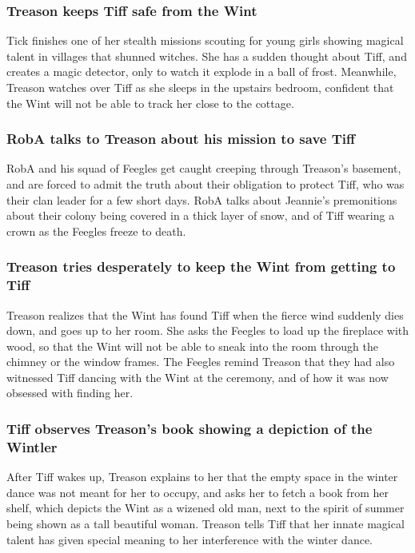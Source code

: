 \subsubsection{\Gls{Treason} keeps \Gls{Tiff} safe from the \Gls{Wint}}
\Gls{Tick} finishes one of her stealth missions scouting for young girls showing magical talent in
villages that shunned witches. She has a sudden thought about \Gls{Tiff}, and creates a magic
detector, only to watch it explode in a ball of frost. Meanwhile, \Gls{Treason} watches over
\Gls{Tiff} as she sleeps in the upstairs bedroom, confident that the \Gls{Wint} will not be able to
track her close to the cottage.

\subsubsection{\Gls{RobA} talks to \Gls{Treason} about his mission to save \Gls{Tiff}}
\Gls{RobA} and his squad of Feegles get caught creeping through \Gls{Treason}'s basement, and are
forced to admit the truth about their obligation to protect \Gls{Tiff}, who was their clan leader
for a few short days. \Gls{RobA} talks about \Gls{Jeannie}'s premonitions about their colony being
covered in a thick layer of snow, and of \Gls{Tiff} wearing a crown as the Feegles freeze to death.

\subsubsection{\Gls{Treason} tries desperately to keep the \Gls{Wint} from getting to \Gls{Tiff}}
\Gls{Treason} realizes that the \Gls{Wint} has found \Gls{Tiff} when the fierce wind suddenly dies
down, and goes up to her room. She asks the Feegles to load up the fireplace with wood, so that
the \Gls{Wint} will not be able to sneak into the room through the chimney or the window frames.
The Feegles remind \Gls{Treason} that they had also witnessed \Gls{Tiff} dancing with the \Gls{Wint}
at the ceremony, and of how it was now obsessed with finding her.

\subsubsection{\Gls{Tiff} observes \Gls{Treason}'s book showing a depiction of the \Gls{Wintler}}
After \Gls{Tiff} wakes up, \Gls{Treason} explains to her that the empty space in the winter dance
was not meant for her to occupy, and asks her to fetch a book from her shelf, which depicts the
\Gls{Wint} as a wizened old man, next to the spirit of summer being shown as a tall beautiful woman.
\Gls{Treason} tells \Gls{Tiff} that her innate magical talent has given special meaning to her
interference with the winter dance.


